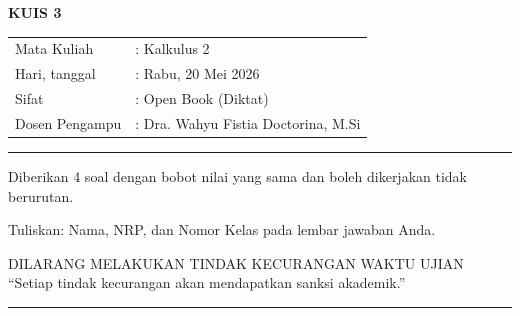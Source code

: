\documentclass[a4paper,12pt]{article}
\begin{document}
\begin{center}
  {\Large \textbf{KUIS 3}}
\end{center}

\vspace{0.5cm}

\begin{tabular}{ll}
  Mata Kuliah    & : Kalkulus 2                        \\
  Hari, tanggal  & : Rabu, 20 Mei 2026                 \\
  Sifat          & : Open Book (Diktat)                \\
  Dosen Pengampu & : Dra. Wahyu Fistia Doctorina, M.Si \\
\end{tabular}

\vspace{0.5cm}
\parindent=0pt
\rule{\textwidth}{2pt}
\vspace{0.1cm}


Diberikan 4 soal dengan bobot nilai yang sama dan boleh dikerjakan tidak berurutan.

Tuliskan: Nama, NRP, dan Nomor Kelas pada lembar jawaban Anda.

\vspace{0.5cm}

\begin{center}
  \textnormal{DILARANG MELAKUKAN TINDAK KECURANGAN WAKTU UJIAN} \\
  ``Setiap tindak kecurangan akan mendapatkan sanksi akademik.''
\end{center}

\vspace{0.1cm}
\rule{\textwidth}{2pt}
\vspace{0.5cm}
\end{document}
